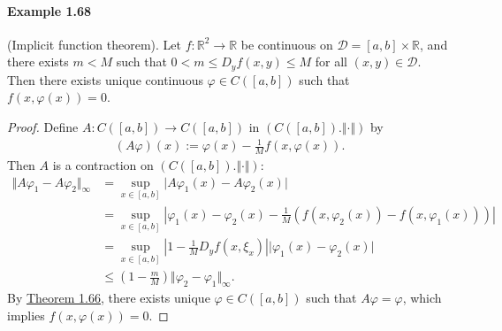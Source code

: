 \documentclass{article}
\begin{document}
\paragraph{Example 1.68\label{example:1.68}} (Implicit function theorem). Let $f:\mathbb{R}^2\to\mathbb{R}$ be continuous on $\mathcal{D} = [a,b]\times\mathbb{R}$, and there exists $m<M$ such that $0<m\leq D_y f(x,y)\leq M$ for all $(x,y)\in\mathcal{D}$. Then there exists unique continuous $\varphi\in C([a,b])$ such that $f(x,\varphi(x))=0$.
\begin{proof}
Define $A:C([a,b])\to C([a,b])$ in $(C([a,b]).\Vert\cdot\Vert)$ by
\begin{align*}
	(A\varphi)(x):=\varphi(x) - \frac{1}{M} f(x,\varphi(x)).
\end{align*}
Then $A$ is a contraction on $(C([a,b]).\Vert\cdot\Vert)$:
\begin{align*}
	\Vert A\varphi_1 - A\varphi_2\Vert_\infty &= \sup_{x\in[a,b]}\vert A\varphi_1(x) - A\varphi_2(x)\vert\\
	&= \sup_{x\in[a,b]}\left\vert \varphi_1(x)-\varphi_2(x) - \frac{1}{M}\left(f(x,\varphi_2(x))-f(x,\varphi_1(x))\right) \right\vert\\
	&= \sup_{x\in[a,b]}\left\vert 1- \frac{1}{M}D_yf(x,\xi_x)\right\vert\vert\varphi_1(x) -\varphi_2(x)\vert \tag{By mean value theorem}\\
	&\leq \left(1-\frac{m}{M}\right)\Vert\varphi_2-\varphi_1\Vert_\infty.
\end{align*}
By \hyperref[thm:1.66]{Theorem 1.66}, there exists unique $\varphi\in C([a,b])$ such that $A\varphi=\varphi$, which implies $f(x,\varphi(x))=0$.
\end{proof}
\end{document}
